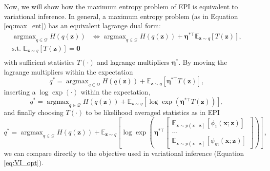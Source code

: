 \documentclass[11pt]{article}
\DeclareMathOperator*{\argmax}{argmax}
\begin{document}
Now, we will show how the maximum entropy problem of EPI is equivalent to variational inference.
In general, a maximum entropy problem (as in Equation \ref{eq:max_ent}) has an equivalent lagrange dual form:
\begin{equation}
\begin{split}
\argmax_{q \in \mathcal{Q}} H(q(\mathbf{z})) &\Longleftrightarrow \argmax_{q \in \mathcal{Q}} H(q(\mathbf{z})) + \bm{\eta}^{*\top} \mathbb{E}_{\mathbf{z} \sim q} \left[ T(\mathbf{z}) \right], \\
  \text{s.t.  } \mathbb{E}_{\mathbf{z} \sim q}\left[T(\mathbf{z})\right] = \mathbf{0}~& \\
 \end{split}
\end{equation} 
with sufficient statistics $T(\cdot)$ and lagrange multipliers $\bm{\eta}^*$.
By moving the lagrange multipliers within the expectation
\begin{equation}q^* = \argmax_{q \in \mathcal{Q}} H(q(\mathbf{z})) + \mathbb{E}_{\mathbf{z} \sim q} \left[\bm{\eta}^{*\top} T(\mathbf{z}) \right],
\end{equation} 
inserting a $\log \exp(\cdot)$ within the expectation, 
\begin{equation} q^* = \argmax_{q \in \mathcal{Q}} H(q(\mathbf{z})) + \mathbb{E}_{\mathbf{z} \sim q} \left[\log \exp \left( \bm{\eta}^{*\top} T(\mathbf{z}) \right) \right],
\end{equation}
and finally choosing $T(\cdot)$ to be likelihood averaged statistics as in EPI
\begin{equation} \label{eq:epi_vi}
q^* = \argmax_{q \in \mathcal{Q}} H(q(\mathbf{z})) + \mathbb{E}_{\mathbf{z} \sim q} \left[\log \exp \left( \bm{\eta}^{*\top} \begin{bmatrix} \mathbb{E}_{\mathbf{x} \sim p(\mathbf{x} \mid \mathbf{z})} \left[ \phi_1(\mathbf{x}; \mathbf{z}) \right] \\ ... \\ \mathbb{E}_{\mathbf{x} \sim p(\mathbf{x} \mid \mathbf{z})} \left[ \phi_m(\mathbf{x}; \mathbf{z}) \right] \end{bmatrix} \right) \right],
\end{equation}
we can compare directly to the objective used in variational inference  (Equation \ref{eq:VI_opt}).
\end{document}
